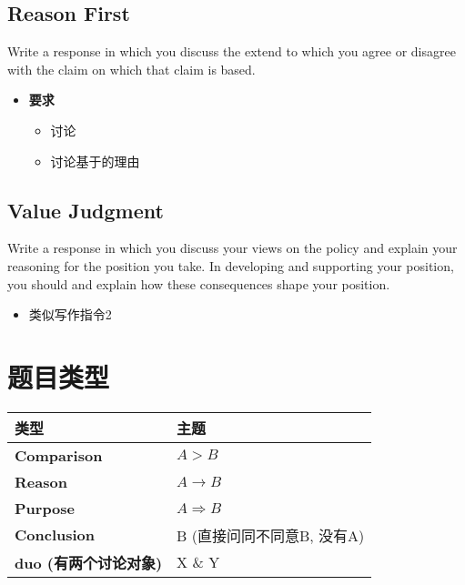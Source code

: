   \subsection{Reason First}

    Write a response in which you discuss the extend to which you agree or
    disagree with the claim  on which that claim
    is based.

    \begin{itemize}
      \item \textbf{要求}
      \begin{itemize}
        \item 讨论
        \item 讨论基于的理由
      \end{itemize}
    \end{itemize}

  \subsection{Value Judgment}

    Write a response in which you discuss your views on the policy and
    explain your reasoning for the position you take. In developing and
    supporting your position, you should  and explain how these
    consequences shape your position.

    \begin{itemize}
      \item 类似写作指令2
    \end{itemize}

\section{题目类型}

  \begin{tabu} to \columnwidth{| X[1, c] | X[1, c] |}
    \hline
    \textbf{类型} & \textbf{主题} \\ \hline
    \textbf{Comparison} & $ A > B $ \\ \hline
    \textbf{Reason} & $ A \rightarrow B $ \\ \hline
    \textbf{Purpose} & $ A \Rightarrow B $ \\ \hline
    \textbf{Conclusion} & B (直接问同不同意B, 没有A) \\ \hline
    \textbf{duo (有两个讨论对象)} & X \& Y \\ \hline
  \end{tabu}

  

